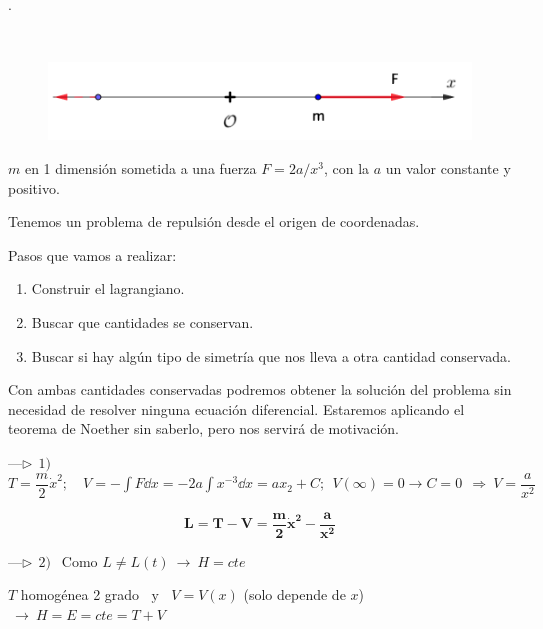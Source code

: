 \begin{example}
. \begin{multicols}{2}	

	$\,$
	
	\begin{figure}[H]
	\centering
	\includegraphics[width=.5\textwidth]{imagenes/img14-02.png}
\end{figure}


$m$ en 1 dimensión sometida a una fuerza $F=2a/x^3$, con la $a$ un valor constante y positivo. 

\vspace{2mm} Tenemos un problema de repulsión desde el origen de coordenadas.
\end{multicols}
\end{example}

Pasos que vamos a realizar:

\vspace{-3mm}  \begin{enumerate}
\vspace{-3mm} \item Construir el lagrangiano.
\vspace{-3mm} \item Buscar que cantidades se conservan.
\vspace{-3mm} \item Buscar si hay algún tipo de simetría que nos lleva a otra cantidad conservada.	
\end{enumerate}

\vspace{-3mm} Con ambas cantidades conservadas podremos obtener la solución del problema sin necesidad de resolver ninguna ecuación diferencial. Estaremos aplicando el teorema de Noether sin saberlo, pero nos servirá de motivación.

\vspace{5mm} ---$\triangleright\ \ 1)\ \ $ $T=\dfrac m 2 \dot x^2;\quad V=-\int F \dd x=-2a\int x^{-3} \dd x=ax_2+C; \ \  V(\infty)=0 \to C=0 \ \ \Rightarrow \ V=\dfrac a {x^2}$

$$\boldsymbol{ L=T-V=\dfrac m 2 \dot x^2 - \dfrac {a}{x^2} }$$

\vspace{5mm} ---$\triangleright\ \ 2)\ \ $ Como $L\neq L(t) \ \to \ H=cte$

$T$ homogénea 2 grado $\ \text{ y } \ $ $V=V(x)$ (solo depende de $x$) $\ \to \ H=E=cte=T+V$

